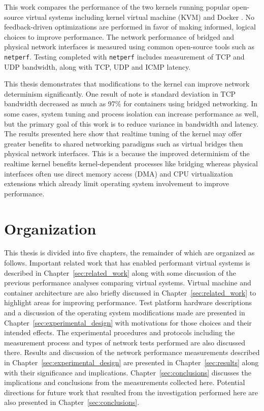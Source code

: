 This work compares the performance of the two kernels running popular open-source virtual systems including kernel virtual machine (KVM) and Docker \autocite{dockerdotcom}.
No feedback-driven optimizations are performed in favor of making informed, logical choices to improve performance.
The network performance of bridged and physical network interfaces is measured using common open-source tools such as \texttt{netperf}.
Testing completed with \texttt{netperf} includes measurement of TCP and UDP bandwidth, along with TCP, UDP and ICMP latency.

This thesis demonstrates that modifications to the kernel can improve network determinism significantly.  
One result of note is standard deviation in TCP bandwidth decreased as much as 97\% for containers using bridged networking.
In some cases, system tuning and process isolation can increase performance as well, but the primary goal of this work is to reduce variance in bandwidth and latency.
The results presented here show that realtime tuning of the kernel may offer greater benefits to shared networking paradigms such as virtual bridges then physical network interfaces.
This is a because the improved determinism of the realtime kernel benefits kernel-dependent processes like bridging whereas physical interfaces often use direct memory access (DMA) and CPU virtualization extensions which already limit operating system involvement to improve performance. 

\section{Organization} %
\label{sec:introorganization}

This thesis is divided into five chapters, the remainder of which are organized as follows.
Important related work that has enabled performant virtual systems is described in Chapter~\ref{sec:related_work} along with some discussion of the previous performance analyses comparing virtual systems.
Virtual machine and container architecture are also briefly discussed in Chapter~\ref{sec:related_work} to highlight areas for improving performance.
Test platform hardware descriptions and a discussion of the operating system modifications made are presented in Chapter~\ref{sec:experimental_design} with motivations for those choices and their intended effects.
The experimental procedures and protocols including the measurement process and types of network tests performed are also discussed there.
Results and discussion of the network performance measurements described in Chapter~\ref{sec:experimental_design} are presented in Chapter~\ref{sec:results} along with their significance and implications.  
Chapter~\ref{sec:conclusions} discusses the implications and conclusions from the measurements collected here.
Potential directions for future work that resulted from the investigation performed here are also presented in Chapter~\ref{sec:conclusions}.

\nocite{welchgenivt}
